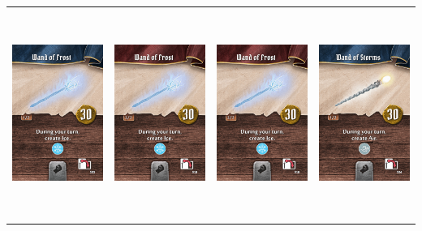 \documentclass{minimal}
\begin{document}
{\begin{longtable}{llll}
\includegraphics[width=44mm,height=68mm]{./64-151/gh-083a-wand-of-frost.png} &
\includegraphics[width=44mm,height=68mm]{./64-151/gh-083b-wand-of-frost.png} &
\includegraphics[width=44mm,height=68mm]{./64-151/gh-083b-wand-of-frost.png} &
\includegraphics[width=44mm,height=68mm]{./64-151/gh-084a-wand-of-storms.png}\\ 

\end{longtable}}
\end{document}
